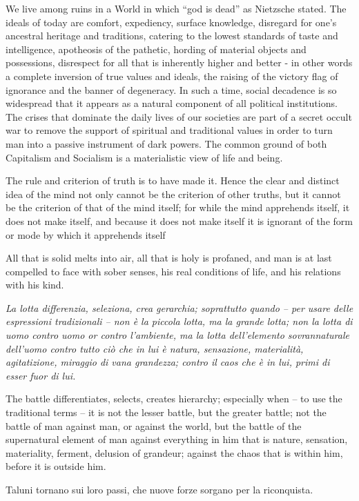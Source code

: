 \label{sec:DescartesNightmare}
\begin{quotex}
We live among ruins in a World in which ``god is dead'' as Nietzsche stated. The ideals of today are comfort, expediency, surface knowledge, disregard for one's ancestral heritage and traditions, catering to the lowest standards of taste and intelligence, apotheosis of the pathetic, hording of material objects and possessions, disrespect for all that is inherently higher and better - in other words a complete inversion of true values and ideals, the raising of the victory flag of ignorance and the banner of degeneracy. In such a time, social decadence is so widespread that it appears as a natural component of all political institutions. The crises that dominate the daily lives of our societies are part of a secret occult war to remove the support of spiritual and traditional values in order to turn man into a passive instrument of dark powers. The common ground of both Capitalism and Socialism is a materialistic view of life and being.


The rule and criterion of truth is to have made it. Hence the clear and distinct idea of the mind not only cannot be the criterion of other truths, but it cannot be the criterion of that of the mind itself; for while the mind apprehends itself, it does not make itself, and because it does not make itself it is ignorant of the form or mode by which it apprehends itself


All that is solid melts into air, all that is holy is profaned, and man is at last compelled to face with sober senses, his real conditions of life, and his relations with his kind.


\textit{La lotta differenzia, seleziona, crea gerarchia; soprattutto quando – per usare delle espressioni tradizionali – non è la piccola lotta, ma la grande lotta; non la lotta di uomo contro uomo or contro l'ambiente, ma la lotta dell'elemento sovrannaturale dell'uomo contro tutto ciò che in lui è natura, sensazione, materialità, agitatizione, miraggio di vana grandezza; contro il caos che è in lui, primi di esser fuor di lui.}

The battle differentiates, selects, creates hierarchy; especially when – to use the traditional terms – it is not the lesser battle, but the greater battle; not the battle of man against man, or against the world, but the battle of the supernatural element of man against everything in him that is nature, sensation, materiality, ferment, delusion of grandeur; against the chaos that is within him, before it is outside him.


Taluni tornano sui loro passi, che nuove forze sorgano per la riconquista.

\end{quotex}

